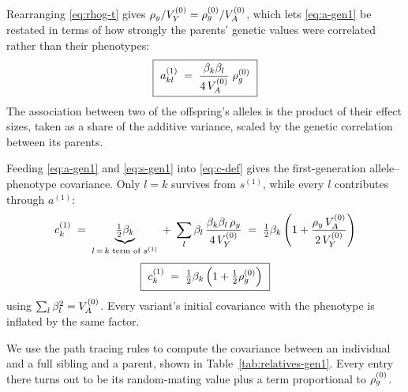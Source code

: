 \documentclass[12pt]{article}
\begin{document}
Rearranging \eqref{eq:rhog-t} gives $\rho_y/V_Y^{(0)} = \rho_g^{(0)}/V_A^{(0)}$, which lets \eqref{eq:a-gen1} be restated in terms of how strongly the parents' genetic values were correlated rather than their phenotypes:
\begin{equation}\label{eq:a-gen1-rhog}
    \boxed{\ a^{(1)}_{kl} \;=\; \frac{\beta_k\beta_l}{4\,\VAo}\;\rhogo \ }
\end{equation}
The association between two of the offspring's alleles is the product of their effect sizes, taken as a share of the additive variance, scaled by the genetic correlation between its parents.

Feeding \eqref{eq:a-gen1} and \eqref{eq:s-gen1} into \eqref{eq:c-def} gives the first-generation allele--phenotype covariance.
Only $l = k$ survives from $s^{(1)}$, while every $l$ contributes through $a^{(1)}$:
\begin{equation}\label{eq:c-gen1}
    \begin{gathered}
        c^{(1)}_k
        \;=\; \underbrace{\tfrac12\beta_k}_{l\,=\,k \text{ term of } s^{(1)}}
        \;+\; \sum_{l} \beta_l\,\frac{\beta_k\beta_l\,\rho_y}{4\,V_Y^{(0)}} 
        \;=\; \tfrac12\beta_k\left(1 + \frac{\rho_y\,V_A^{(0)}}{2\,V_Y^{(0)}}\right) \\[4pt]
        \boxed{\
        c^{(1)}_k  \;=\; \tfrac12\beta_k\left(1 + \tfrac12\rho_g^{(0)}\right)
        \ }
    \end{gathered}
\end{equation}
using $\sum_l \beta_l^2 = V_A^{(0)}$.
Every variant's initial covariance with the phenotype is inflated by the same factor.

We use the path tracing rules to compute the covariance between an individual and a full sibling and a parent, shown in Table~\ref{tab:relatives-gen1}.
Every entry there turns out to be its random-mating value plus a term proportional to $\rho_g^{(0)}$.
\end{document}
